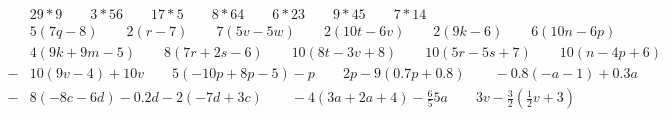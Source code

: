 \documentclass{article}
\begin{document}
\bigskip

\(\begin{aligned}
	&29*9 \qquad 3*56 \qquad 17*5 \qquad 8*64 \qquad 6*23 \qquad 9*45 \qquad 7*14 \\[2em]
	&5(7q-8)  \qquad 2(r-7) \qquad 7(5v-5w) \qquad 2(10t-6v)\qquad 2(9k-6) \qquad 6(10n-6p)  \\[2em]
	&4(9k+9m-5) \qquad 8(7r+2s-6) \qquad 10(8t-3v+8) \qquad 10(5r-5s+7) \qquad 10(n-4p+6) \\[2em]
	-&10(9v-4)+10v \qquad 5(-10p+8p-5)-p \qquad 2p-9(0.7p+0.8) \qquad -0.8(-a-1)+0.3a\\[2em]
	-&8(-8c-6d)-0.2d-2(-7d+3c) \qquad-4(3a+2a+4)-\frac{6}{5}5a \qquad 3v-\frac{3}{2}(\frac{1}{2}v+3)\\\\
\end{aligned}\)
\end{document}
